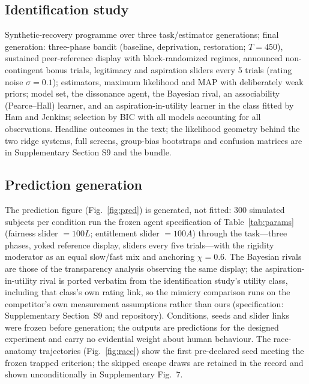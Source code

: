 \documentclass[11pt]{article}
\newcommand{\1}{\mathbf{1}}
\begin{document}
\subsection{Identification study}
Synthetic-recovery programme over three task/estimator generations; final generation: three-phase bandit (baseline, deprivation, restoration; $T=450$), sustained peer-reference display with block-randomized regimes, announced non-contingent bonus trials, legitimacy and aspiration sliders every 5 trials (rating noise $\sigma=0.1$); estimators, maximum likelihood and MAP with deliberately weak priors; model set, the dissonance agent, the Bayesian rival, an associability (Pearce--Hall) learner\cite{PearceHall1980}, and an aspiration-in-utility learner in the class fitted by Ham and Jenkins\cite{HamJenkins2025}; selection by BIC with all models accounting for all observations. Headline outcomes in the text; the likelihood geometry behind the two ridge systems, full screens, group-bias bootstraps and confusion matrices are in Supplementary Section S9 and the bundle.

\subsection{Prediction generation}
The prediction figure (Fig.~\ref{fig:pred}) is generated, not fitted: 300 simulated subjects per condition run the frozen agent specification of Table~\ref{tab:params} (fairness slider $=100L$; entitlement slider $=100A$) through the task---three phases, yoked reference display, sliders every five trials---with the rigidity moderator as an equal slow/fast mix and anchoring $\chi=0.6$. The Bayesian rivals are those of the transparency analysis observing the same display; the aspiration-in-utility rival is ported verbatim from the identification study's utility class, including that class's own rating link, so the mimicry comparison runs on the competitor's own measurement assumptions rather than ours (specification: Supplementary Section~S9 and repository). Conditions, seeds and slider links were frozen before generation; the outputs are predictions for the designed experiment and carry no evidential weight about human behaviour. The race-anatomy trajectories (Fig.~\ref{fig:race}) show the first pre-declared seed meeting the frozen trapped criterion; the skipped escape draws are retained in the record and shown unconditionally in Supplementary Fig.~7.
\end{document}
